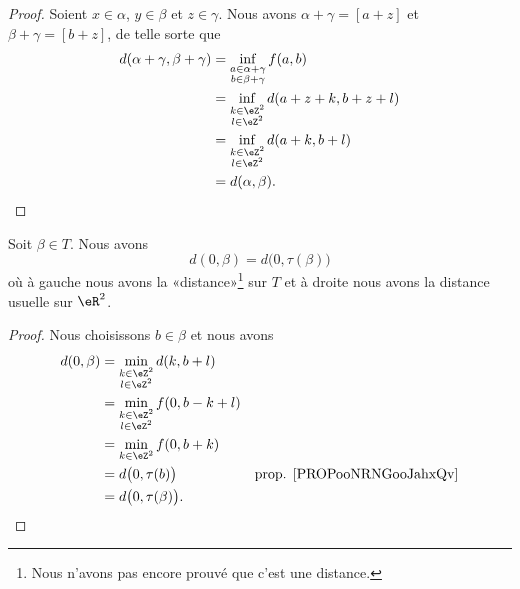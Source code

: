 \begin{proof}
	Soient \( x\in \alpha\), \( y\in \beta\) et \( z\in \gamma\). Nous avons \( \alpha+\gamma=[a+z]\) et \( \beta+\gamma=[b+z]\), de telle sorte que
	\begin{subequations}
		\begin{align}
			d(\alpha+\gamma,\beta+\gamma) & =\inf_{\substack{ a\in\alpha+\gamma \\ b\in \beta+\gamma }  }f(a,b)\\
			                              & =\inf_{\substack{ k\in \eZ^2        \\ l\in \eZ^2 }  }d(a+z+k,b+z+l)\\
			                              & =\inf_{\substack{ k\in \eZ^2        \\ l\in \eZ^2 }  }d(a+k,b+l)\\
			                              & =d(\alpha,\beta).
		\end{align}
	\end{subequations}
\end{proof}

\begin{lemma}	\label{LEMooQNDHooFXYjtj}
	Soit \( \beta\in T\). Nous avons
	\begin{equation}
		d(0,\beta)=d\big( 0,\tau(\beta) \big)
	\end{equation}
	où à gauche nous avons la «distance»\footnote{Nous n'avons pas encore prouvé que c'est une distance.} sur \( T\) et à droite nous avons la distance usuelle sur \( \eR^2\).
\end{lemma}

\begin{proof}
	Nous choisissons \( b\in \beta\) et nous avons
	\begin{subequations}
		\begin{align}
			d(0,\beta) & =\min_{\substack{ k\in \eZ^2                                         \\ l\in \eZ^2 }  }d(k,b+l)\\
			           & =\min_{\substack{ k\in \eZ^2                                         \\ l\in \eZ^2 }  }f(0,b-k+l)\\
			           & =\min_{k\in\eZ^2}f(0,b+k)                                            \\
			           & =d\big( 0,\tau(b) \big)      & \text{prop. \ref{PROPooNRNGooJahxQv}} \\
			           & =d\big( 0,\tau(\beta) \big).
		\end{align}
	\end{subequations}
\end{proof}


